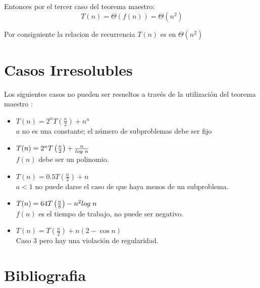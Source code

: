 \documentclass[12pt]{article} %
\begin{document}
\hspace{-0.5cm}Entonces por el tercer caso del teorema maestro:
\begin{equation*}
    \label{eq:ecuacion6}
    \ T(n) = \Theta \left(f(n)\right) = \Theta ({n}^{2})
\end{equation*}

\hspace{-0.5cm}Por consiguiente la relacion de recurrencia $T(n)$ es en $\Theta ({n}^{2})$

\section{Casos Irresolubles}
\vspace{-0.5cm}
\hrulefill
\justify Los siguientes casos no pueden ser resueltos a través de la utilización del teorema maestro \cite{cormen2009introduction}:
\begin{itemize}
    \item $T(n)= {2}^{n} T \left(\frac{n}{2}\right) + {n}^{n}$\\
    $a$ no es una constante; el número de subproblemas debe ser fijo
 
    \item $T(n)= {2}^{n} T \left(\frac{n}{2}\right) + \frac{n}{log \hspace{1mm}n}$\\
    $f(n)$ debe ser un polinomio.
 
    \item $T(n)= 0.5  T \left(\frac{n}{2}\right) + n$\\
    $a<1$ no puede darse el caso de que haya menos de un subproblema.
    
    \item $T(n)= 64 T \left(\frac{n}{8}\right) - {n}^{2} log \hspace{1mm} n$\\
    $f(n)$ es el tiempo de trabajo, no puede ser negativo.
    
    \item  $T(n)= T \left(\frac{n}{2}\right) + n(2-\cos{n})$\\
    Caso 3 pero hay una violación de regularidad.
    
    
\end{itemize}


\section{Bibliografia}
\printbibliography[title={Bibliografía}]
\end{document}
